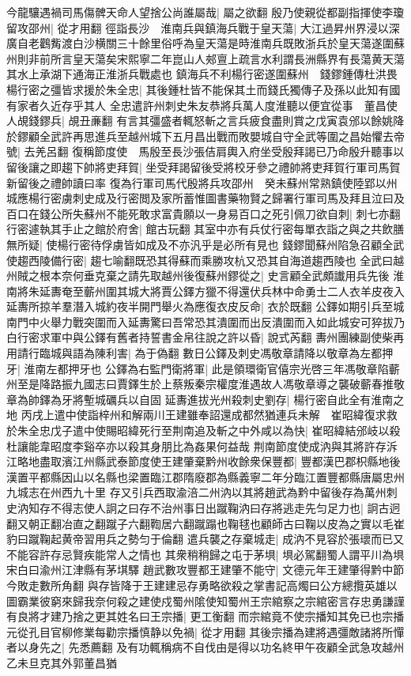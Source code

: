 今龍驤遇禍司馬傷髀天命人望捨公尚誰屬哉|{
	屬之欲翻}
殷乃使親從都副指揮使李瓊留攻邵州|{
	從才用翻}
徑詣長沙　淮南兵與鎮海兵戰于皇天蕩|{
	大江過昇州界浸以深廣自老鸛觜渡白沙横關三十餘里俗呼為皇天蕩是時淮南兵既敗浙兵於皇天蕩遂圍蘇州則非前所言皇天蕩矣宋熙寧二年崑山人郟亶上疏言水利謂長洲縣界有長蕩黄天蕩其水上承湖下通海正淮浙兵戰處也}
鎮海兵不利楊行密遂圍蘇州　錢鏐鍾傳杜洪畏楊行密之彊皆求援於朱全忠|{
	其後鍾杜皆不能保其土而錢氏獨傳子及孫以此知有國有家者久近存乎其人}
全忠遣許州刺史朱友恭將兵萬人度淮聽以便宜從事　董昌使人覘錢鏐兵|{
	覘丑亷翻}
有言其彊盛者輒怒斬之言兵疲食盡則賞之戊寅袁邠以餘姚降於鏐顧全武許再思進兵至越州城下五月昌出戰而敗嬰城自守全武等圍之昌始懼去帝號|{
	去羌呂翻}
復稱節度使　馬殷至長沙張佶肩輿入府坐受殷拜謁已乃命殷升聽事以留後讓之即趨下帥將吏拜賀|{
	坐受拜謁留後受將校牙參之禮帥將吏拜賀行軍司馬賀新留後之禮帥讀曰率}
復為行軍司馬代殷將兵攻邵州　癸未蘇州常熟鎮使陸郢以州城應楊行密虜刺史成及行密閲及家所蓄惟圖書藥物賢之歸署行軍司馬及拜且泣曰及百口在錢公所失蘇州不能死敢求富貴願以一身易百口之死引佩刀欲自刺|{
	刺七亦翻}
行密遽執其手止之館於府舍|{
	館古玩翻}
其室中亦有兵仗行密每單衣詣之與之共飲膳無所疑|{
	使楊行密待俘虜皆如成及不亦汎乎是必所有見也}
錢鏐聞蘇州陷急召顧全武使趨西陵備行密|{
	趨七喻翻既恐其得蘇而乘勝攻杭又恐其自海道趨西陵也}
全武曰越州賊之根本奈何垂克棄之請先取越州後復蘇州鏐從之|{
	史言顧全武頗䜟用兵先後}
淮南將朱延夀奄至蘄州圍其城大將賈公鐸方獵不得還伏兵林中命勇士二人衣羊皮夜入延夀所掠羊羣潛入城約夜半開門舉火為應復衣皮反命|{
	衣於既翻}
公鐸如期引兵至城南門中火舉力戰突圍而入延夀驚曰吾常恐其潰圍而出反潰圍而入如此城安可猝拔乃白行密求軍中與公鐸有舊者持誓書金帛往說之許以昏|{
	說式芮翻}
夀州團練副使柴再用請行臨城與語為陳利害|{
	為于偽翻}
數日公鐸及刺史馮敬章請降以敬章為左都押牙|{
	淮南左都押牙也}
公鐸為右監門衛將軍|{
	此是領環衛官僖宗光啓三年馮敬章陷蘄州至是降路振九國志曰賈鐸生於上蔡叛秦宗權度淮遇故人馮敬章導之襲破蘄春推敬章為帥鐸為牙將塹城礪兵以自固}
延夀進拔光州殺刺史劉存|{
	楊行密自此全有淮南之地}
丙戌上遣中使詣梓州和解兩川王建雖奉詔還成都然猶連兵未解　崔昭緯復求救於朱全忠戊子遣中使賜昭緯死行至荆南追及斬之中外咸以為快|{
	崔昭緯結邠岐以殺杜讓能韋昭度李谿卒亦以殺其身朋比為姦果何益哉}
荆南節度使成汭與其將許存泝江略地盡取濱江州縣武泰節度使王建肇棄黔州收餘衆保豐都|{
	豐都漢巴郡枳縣地後漢置平都縣因山以名縣也梁置臨江郡隋廢郡為縣義寧二年分臨江置豐都縣唐屬忠州九城志在州西九十里}
存又引兵西取渝涪二州汭以其將趙武為黔中留後存為萬州刺史汭知存不得志使人詗之曰存不治州事日出蹴鞠汭曰存將逃走先匀足力也|{
	詗古迥翻又朝正翻冶直之翻蹴子六翻鞫居六翻蹴蹋也鞠毬也顧師古曰鞠以皮為之實以毛崔豹曰蹴鞠起黄帝習用兵之勢匀于倫翻}
遣兵襲之存棄城走|{
	成汭不見容於張瓌而已又不能容許存忌賢疾能常人之情也}
其衆稍稍歸之屯于茅埧|{
	埧必駕翻蜀人謂平川為埧宋白曰渝州江津縣有茅㙋驛}
趙武數攻豐都王建肇不能守|{
	文德元年王建肇得黔中節今敗走數所角翻}
與存皆降于王建建忌存勇略欲殺之掌書記高燭曰公方總攬英雄以圖霸業彼窮來歸我奈何殺之建使戍蜀州隂使知蜀州王宗綰察之宗綰密言存忠勇謙謹有良將才建乃捨之更其姓名曰王宗播|{
	更工衡翻}
而宗綰竟不使宗播知其免已也宗播元從孔目官柳修業每勸宗播慎静以免禍|{
	從才用翻}
其後宗播為建將遇彊敵諸將所憚者以身先之|{
	先悉薦翻}
及有功輒稱病不自伐由是得以功名終甲午夜顧全武急攻越州乙未旦克其外郭董昌猶

